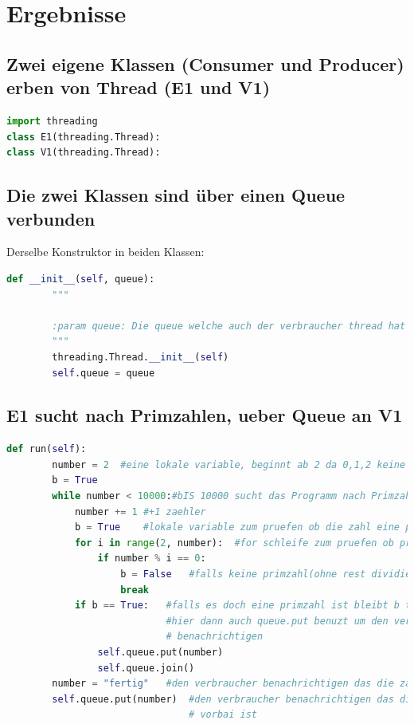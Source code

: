 
\section{Ergebnisse}

\subsection{Zwei eigene Klassen (Consumer und Producer) erben von Thread (E1 und V1)}

\begin{lstlisting}[language=python]
import threading
class E1(threading.Thread):
class V1(threading.Thread):
\end{lstlisting}

\subsection{Die zwei Klassen sind über einen Queue verbunden}

Derselbe Konstruktor in beiden Klassen:\\
\begin{lstlisting}[language=python]
    def __init__(self, queue):
        """

        :param queue: Die queue welche auch der verbraucher thread hat
        """
        threading.Thread.__init__(self)
        self.queue = queue
\end{lstlisting}

\subsection{E1 sucht nach Primzahlen, ueber Queue an V1}

\begin{lstlisting}[language=python]
       def run(self):
        number = 2  #eine lokale variable, beginnt ab 2 da 0,1,2 keine Primzahlen sind
        b = True
        while number < 10000:#bIS 10000 sucht das Programm nach Primzahlen
            number += 1 #+1 zaehler
            b = True    #lokale variable zum pruefen ob die zahl eine prmzahl ist
            for i in range(2, number):  #for schleife zum pruefen ob primzahl
                if number % i == 0:
                    b = False   #falls keine primzahl(ohne rest dividierbar)
                    break
            if b == True:   #falls es doch eine primzahl ist bleibt b true und somit wird
                            #hier dann auch queue.put benuzt um den verbraucher zu
                            # benachrichtigen
                self.queue.put(number)
                self.queue.join()
        number = "fertig"   #den verbraucher benachrichtigen das die zaehlung vorbai ist
        self.queue.put(number)  #den verbraucher benachrichtigen das die zaehlung
                                # vorbai ist

\end{lstlisting}

